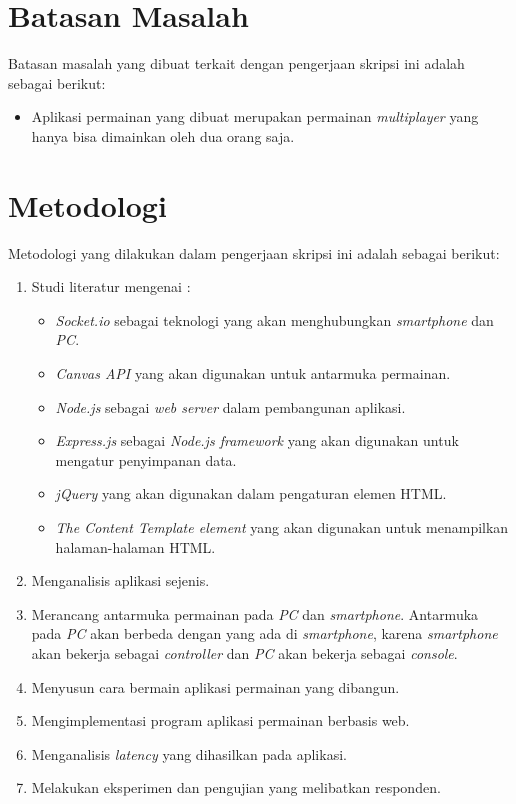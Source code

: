 \section{Batasan Masalah}
\label{sec:batasan}

Batasan masalah yang dibuat terkait dengan pengerjaan skripsi ini adalah sebagai berikut:

\begin{itemize}
	\item Aplikasi permainan yang dibuat merupakan permainan \textit{multiplayer} yang hanya bisa dimainkan oleh dua orang saja.
\end{itemize}


\section{Metodologi}
\label{sec:metlit}
Metodologi yang dilakukan dalam pengerjaan skripsi ini adalah sebagai berikut:

\begin{enumerate}
	\item Studi literatur mengenai :
		\begin{itemize}
			\item \textit{Socket.io} sebagai teknologi yang akan menghubungkan \textit{smartphone} dan \textit{PC}.
			\item \textit{Canvas API} yang akan digunakan untuk antarmuka permainan.
			\item \textit{Node.js} sebagai \textit{web server} dalam pembangunan aplikasi. 	
			\item \textit{Express.js} sebagai \textit{Node.js framework} yang akan digunakan untuk mengatur penyimpanan data.
			\item \textit{jQuery} yang akan digunakan dalam pengaturan elemen HTML.
			\item \textit{The Content Template element} yang akan digunakan untuk menampilkan halaman-halaman HTML.
		\end{itemize}
	\item Menganalisis aplikasi sejenis.
	\item Merancang antarmuka permainan pada \textit{PC} dan \textit{smartphone}. Antarmuka pada \textit{PC} akan berbeda dengan yang ada di \textit{smartphone}, karena \textit{smartphone} akan bekerja sebagai \textit{controller} dan \textit{PC} akan bekerja sebagai \textit{console}.
	\item Menyusun cara bermain aplikasi permainan yang dibangun.
	\item Mengimplementasi program aplikasi permainan berbasis web.
	\item Menganalisis \textit{latency} yang dihasilkan pada aplikasi.
	\item Melakukan eksperimen dan pengujian yang melibatkan responden.
\end{enumerate}


